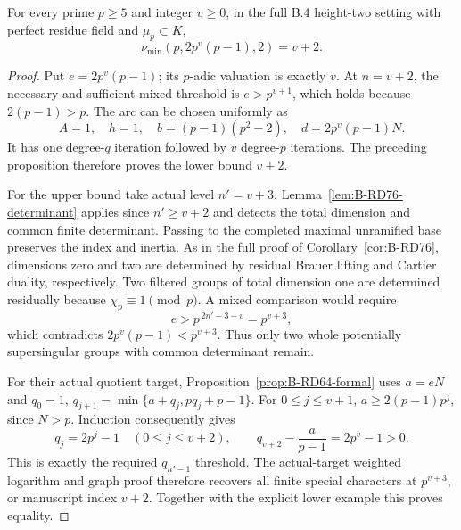 \begin{theorem}
\label{thm:B-RD101-exact}
For every prime $p\ge5$ and integer $v\ge0$, in the
full B.4 height-two setting with perfect residue field
and $\mu_p\subset K$,
\[
              \nu_{\min}(p,2p^v(p-1),2)=v+2 .
                                                        \tag{B-RD101.13}
\]
\end{theorem}
\begin{proof}
Put $e=2p^v(p-1)$; its $p$-adic valuation is exactly $v$.
At $n=v+2$, the necessary and sufficient mixed threshold
is $e>p^{v+1}$, which holds because $2(p-1)>p$.
The arc can be chosen uniformly as
\[
 A=1,\quad h=1,\quad b=(p-1)(p^2-2),\quad
 d=2p^v(p-1)N .
                                                        \tag{B-RD101.14}
\]
It has one degree-$q$ iteration followed by $v$
degree-$p$ iterations. The preceding proposition
therefore proves the lower bound $v+2$.

For the upper bound take actual level $n'=v+3$.
Lemma~\ref{lem:B-RD76-determinant} applies since
$n'\ge v+2$ and detects the total dimension and common
finite determinant. Passing to the completed maximal
unramified base preserves the index and inertia.
As in the full proof of Corollary~\ref{cor:B-RD76},
dimensions zero and two are determined by residual
Brauer lifting and Cartier duality, respectively.
Two filtered groups of total dimension one are
determined residually because $\chi_p\equiv1\pmod p$.
A mixed comparison would require
\[
               e>p^{\,2n'-3-v}=p^{v+3},
                                                        \tag{B-RD101.15}
\]
which contradicts $2p^v(p-1)<p^{v+3}$.
Thus only two whole potentially supersingular groups
with common determinant remain.

For their actual quotient target,
Proposition~\ref{prop:B-RD64-formal} uses
$a=eN$ and $q_0=1$,
$q_{j+1}=\min\{a+q_j,pq_j+p-1\}$.
For $0\le j\le v+1$,
$a\ge2(p-1)p^j$, since $N>p$.
Induction consequently gives
\[
 q_j=2p^j-1\quad(0\le j\le v+2),\qquad
 q_{v+2}-\frac a{p-1}=2p^v-1>0 .
                                                        \tag{B-RD101.16}
\]
This is exactly the required $q_{n'-1}$ threshold.
The actual-target weighted logarithm and graph proof
therefore recovers all finite special characters at
$p^{v+3}$, or manuscript index $v+2$.
Together with the explicit lower example this proves equality.
\end{proof}

